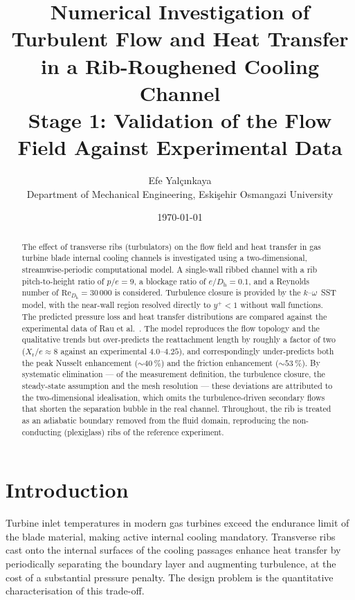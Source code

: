 \documentclass[11pt,a4paper]{article}
\title{\textbf{Numerical Investigation of Turbulent Flow and Heat Transfer
in a Rib-Roughened Cooling Channel}\\[0.4em]
\large Stage 1: Validation of the Flow Field Against Experimental Data}
\author{Efe Yal\c{c}\i nkaya\\
\small Department of Mechanical Engineering, Eski\c{s}ehir Osmangazi University}
\date{\today}
\newcommand{\Dh}{D_{\mathrm{h}}}
\newcommand{\Rey}{\mathrm{Re}}
\newcommand{\Xr}{X_{\mathrm{r}}}
\begin{document}
\maketitle

\begin{abstract}
\noindent
The effect of transverse ribs (turbulators) on the flow field and heat
transfer in gas turbine blade internal cooling channels is investigated
using a two-dimensional, streamwise-periodic computational model. A
single-wall ribbed channel with a rib pitch-to-height ratio of $p/e = 9$,
a blockage ratio of $e/\Dh = 0.1$, and a Reynolds number of
$\Rey_{\Dh} = 30\,000$ is considered. Turbulence closure is provided by the
$k$--$\omega$~SST model, with the near-wall region resolved directly to
$y^{+} < 1$ without wall functions. The predicted pressure loss and heat
transfer distributions are compared against the experimental data of Rau
et al.~\cite{rau1996}. The model reproduces the flow topology and the
qualitative trends but over-predicts the reattachment length by roughly a
factor of two ($\Xr/e \approx 8$ against an experimental $4.0$--$4.25$), and
correspondingly under-predicts both the peak Nusselt enhancement
($\sim\!\SI{40}{\percent}$) and the friction enhancement
($\sim\!\SI{53}{\percent}$). By systematic elimination --- of the
measurement definition, the turbulence closure, the steady-state
assumption and the mesh resolution --- these deviations are attributed
to the two-dimensional
idealisation, which omits the turbulence-driven secondary flows that shorten
the separation bubble in the real channel. Throughout, the rib is treated as
an adiabatic boundary removed from the fluid domain, reproducing the
non-conducting (plexiglass) ribs of the reference experiment.
\end{abstract}

\tableofcontents
\bigskip

\section{Introduction}

Turbine inlet temperatures in modern gas turbines exceed the endurance
limit of the blade material, making active internal cooling mandatory.
Transverse ribs cast onto the internal surfaces of the cooling passages
enhance heat transfer by periodically separating the boundary layer and
augmenting turbulence, at the cost of a substantial pressure penalty. The
design problem is the quantitative characterisation of this trade-off.
\end{document}
